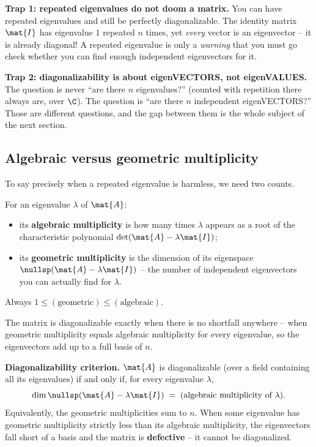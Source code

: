 \begin{trapbox}
\textbf{Trap 1: repeated eigenvalues do not doom a matrix.} You can have repeated
eigenvalues and still be perfectly diagonalizable. The identity matrix $\mat{I}$
has eigenvalue $1$ repeated $n$ times, yet \emph{every} vector is an eigenvector
-- it is already diagonal! A repeated eigenvalue is only a \emph{warning} that
you must go check whether you can find enough independent eigenvectors for it.

\textbf{Trap 2: diagonalizability is about eigenVECTORS, not eigenVALUES.} The
question is never ``are there $n$ eigenvalues?'' (counted with repetition there
always are, over $\C$). The question is ``are there $n$ independent
eigenVECTORS?'' Those are different questions, and the gap between them is the
whole subject of the next section.
\end{trapbox}

\subsection{Algebraic versus geometric multiplicity}
\label{ch24:multiplicity}

To say precisely when a repeated eigenvalue is harmless, we need two counts.

\begin{definition}
\label{ch24:def-mult}
For an eigenvalue $\lambda$ of $\mat{A}$:
\begin{itemize}
  \item its \textbf{algebraic multiplicity} is how many times $\lambda$ appears
        as a root of the characteristic polynomial $\det(\mat{A}-\lambda\mat{I})$;
  \item its \textbf{geometric multiplicity} is the dimension of its eigenspace
        $\nullsp(\mat{A}-\lambda\mat{I})$ -- the number of independent
        eigenvectors you can actually find for $\lambda$.
\end{itemize}
Always $1 \le (\text{geometric}) \le (\text{algebraic})$.
\end{definition}

The matrix is diagonalizable exactly when there is no shortfall anywhere -- when
geometric multiplicity equals algebraic multiplicity for every eigenvalue, so the
eigenvectors add up to a full basis of $n$.

\begin{formalbox}
\textbf{Diagonalizability criterion.} $\mat{A}$ is diagonalizable (over a field
containing all its eigenvalues) if and only if, for every eigenvalue $\lambda$,
\[
  \dim\nullsp(\mat{A}-\lambda\mat{I}) \;=\; \text{(algebraic multiplicity of }\lambda).
\]
Equivalently, the geometric multiplicities sum to $n$. When some eigenvalue has
geometric multiplicity strictly less than its algebraic multiplicity, the
eigenvectors fall short of a basis and the matrix is \textbf{defective} -- it
cannot be diagonalized.
\end{formalbox}


